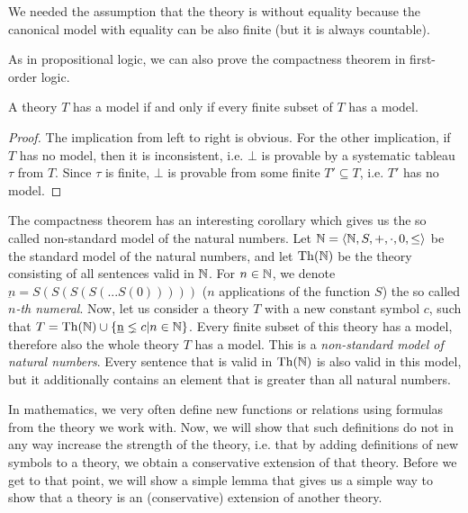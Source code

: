 We needed the assumption that the theory is without equality because the canonical model with equality can be also finite (but it is always countable).

As in propositional logic, we can also prove the compactness theorem in first-order logic.

\begin{theorem}[compactness]
A theory $T$ has a model if and only if every finite subset of $T$ has a model.
\end{theorem}
\begin{proof}
The implication from left to right is obvious. For the other implication, if $T$ has no model, then it is inconsistent, i.e. $\bot$ is provable by a systematic tableau $\tau$ from $T$. Since $\tau$ is finite, $\bot$ is provable from some finite $T' \subseteq T$, i.e. $T'$ has no model.
\end{proof}

The compactness theorem has an interesting corollary which gives us the so called non-standard model of the natural numbers. Let $\mathbb{N} = \langle \mathbb{N}, S, +, \cdot, 0, \leq \rangle$ be the standard model of the natural numbers, and let $\operatorname{Th}(\mathbb{N})$ be the theory consisting of all sentences valid in $\mathbb{N}$. For $n \in \mathbb{N}$, we denote $\underbar{n} = S(S(S(S(... S(0)))))$ ($n$ applications of the function $S$) the so called \emph{$n$-th numeral}. Now, let us consider a theory $T$ with a new constant symbol $c$, such that $T = \operatorname{Th}(\mathbb{N}) \cup \{\underbar{n} \lneq c | n \in \mathbb{N}\}$. Every finite subset of this theory has a model, therefore also the whole theory $T$ has a model. This is a \emph{non-standard model of natural numbers}. Every sentence that is valid in $\operatorname{Th}(\mathbb{N})$ is also valid in this model, but it additionally contains an element that is greater than all natural numbers.

In mathematics, we very often define new functions or relations using formulas from the theory we work with. Now, we will show that such definitions do not in any way increase the strength of the theory, i.e. that by adding definitions of new symbols to a theory, we obtain a conservative extension of that theory. Before we get to that point, we will show a simple lemma that gives us a simple way to show that a theory is an (conservative) extension of another theory.

